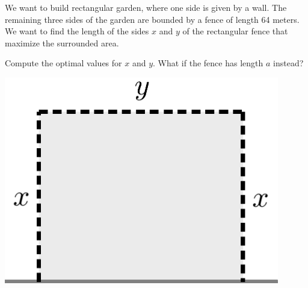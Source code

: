 \begin{minipage}{0.75\textwidth}
\begin{exercise}
	We want to build rectangular garden, where one side is given by a wall.
	The remaining three sides of the garden are bounded by a fence of length 64 meters.
	We want to find the length of the sides $x$ and $y$ of the rectangular fence that
	maximize the surrounded area.
	\begin{tasks}
		\task Compute the optimal values for $x$ and $y$.
		\task What if the fence has length $a$ instead?
	\end{tasks}
\end{exercise}
\end{minipage}\hfill
\begin{minipage}{0.2\textwidth}
\includegraphics[width=0.9\textwidth]{images/fence}
\end{minipage}\\

